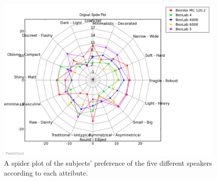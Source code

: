 \begin{figure}[H]
\centering
\includegraphics[width = \textwidth]{Figure/spider_plot.png}
\caption{A spider plot of the subjects' preference of the five different speakers according to each attribute.}
\label{fig:spider_plot}
\end{figure}
\newpage
%
